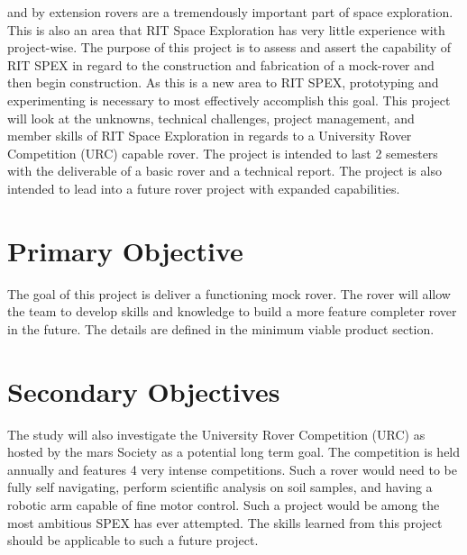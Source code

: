 \documentclass[conference]{IEEEtran} %
\begin{document}
 and by extension rovers are a tremendously important part of space exploration. 
This is also an area that RIT Space Exploration has very little experience with project-wise. 
The purpose of this project is to assess and assert the capability of RIT SPEX in regard to the construction and fabrication of a mock-rover and then begin construction. 
As this is a new area to RIT SPEX, prototyping and experimenting is necessary to most effectively accomplish this goal. 
This project will look at the unknowns, technical challenges, project management, and member skills of RIT Space Exploration in regards to a University Rover Competition (URC) capable rover.
The project is intended to last 2 semesters with the deliverable of a basic rover and a technical report. 
The project is also intended to lead into a future rover project with expanded capabilities.

\section{Primary Objective}
\label{sec:primary-obj}

The goal of this project is deliver a functioning mock rover. The rover will allow the team to develop skills and knowledge to build a more feature completer rover in the future. The details are defined in the minimum viable product section. 


\section{Secondary Objectives}
\label{sec:secondary-obj}
The study will also investigate the University Rover Competition (URC) as hosted by the mars Society as a potential long term goal. The competition is held annually and features 4 very intense competitions. Such a rover would need to be fully self navigating, perform scientific analysis on soil samples, and having a robotic arm capable of fine motor control. Such a project would be among the most ambitious SPEX has ever attempted. The skills learned from this project should be applicable to such a future project. 
\end{document}
